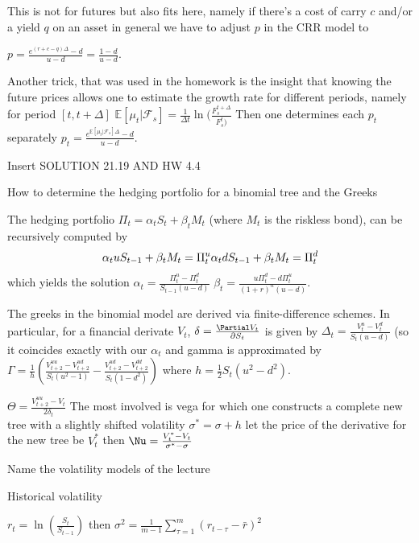 This is not for futures but also fits here, namely if there's a cost of carry \( c \) and/or a yield \( q \) on an asset
in general we have to adjust \( p \) in the CRR model to

\( p = \frac{e^{(r + c - q)\Delta} - d}{u - d} = \frac{1 - d}{u - d} \).

Another trick, that was used in the homework is the insight that knowing the future prices allows one 
to estimate the growth rate for different periods, namely for period \( [t, t + \Delta] \)
\( \mathbb{E}[\mu_t|\mathcal{F}_s] = \frac{1}{\Delta t}\ln(\frac{F_s^{t + \Delta }}{F_s^{t})} \)
Then one determines each \( p_t \) separately
\( p_t = \frac{e^{\mathbb{E}[\mu_t|\mathcal{F}_s]\Delta } - d}{u - d} \).

Insert SOLUTION 21.19 AND HW 4.4



How to determine the hedging portfolio for a binomial tree and the Greeks

The hedging portfolio \( \Pi_t = \alpha_t S_t + \beta_t M_t \) (where \( M_t \) is the riskless bond),
can be recursively computed by 
\[ 
    \alpha_t uS_{t-1} + \beta_{t} M_{t} = \Pi_t^u  \\
    \alpha_t dS_{t-1} + \beta_{t} M_{t} = \Pi_t^d
\]
which yields the solution
\( \alpha_t = \frac{\Pi_t^u - \Pi_t^d}{S_{t-1}(u - d)} \)
\( \beta_t = \frac{u\Pi_t^d - d\Pi_t^u}{(1+r)^n(u - d)} \).

The greeks in the binomial model are derived via finite-difference schemes.
In particular, for a financial derivate \( V_t \), \( \delta = \frac{\Partial V_t}{ \partial S_t} \) is given by
\( \Delta_t = \frac{V_t^u - V_t^d}{S_t(u - d)} \) (so it coincides exactly with our \( \alpha_t \)
and gamma is approximated by
\( \Gamma = \frac{1}{h}(\frac{V_{t+2}^{uu} - V^{ud}_{t+2}}{S_t(u^2 - 1)} - \frac{V_{t+2}^{ud} - V^{dd}_{t+2}}{S_t(1 - d^2)}) \)
where \( h = \frac{1}{2}S_t(u^2 - d^2) \).

\( \Theta = \frac{V_{t+2}^{uu} - V_{t}}{2 \delta_t }  \)
The most involved is vega for which one constructs a complete new tree with a slightly shifted volatility \( \sigma^\ast = \sigma + h \)
let the price of the derivative for the new tree be \( V^\ast_t \) then
\( \Nu = \frac{V^\ast_t - V_t}{\sigma^\ast - \sigma} \)



Name the volatility models of the lecture

Historical volatility

\( r_t = \ln(\frac{S_t}{S_{t-1}}) \) then \( \sigma^2 = \frac{1}{m-1} \sum_{\tau=1}^m (r_{t - \tau} - \bar{r})^2 \) 

